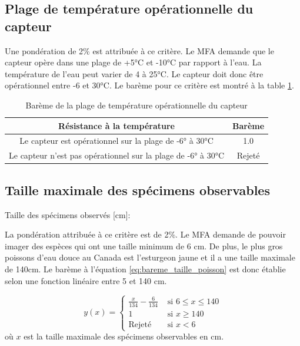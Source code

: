 \subsection{Plage de température opérationnelle du capteur}

Une pondération de 2\% est attribuée à ce critère. Le MFA demande que le capteur opère dans une plage de +5°C et -10°C par rapport à l'eau. La température de l'eau peut varier de 4 à 25°C. Le capteur doit donc être opérationnel entre -6 et 30°C. Le barème pour ce critère est montré à la table \ref{t:bareme_resistance_temperature}.

\begin{table}[htp]
   \footnotesize
   \centering
   \begin{tabular}{|c|c|}
        \hline
        Résistance à la température & Barème\\
        \hline
        \hline
        Le capteur est opérationnel sur la plage de -6° à 30°C & 1.0 \\
        \hline
        Le capteur n'est pas opérationnel sur la plage de -6° à 30°C & Rejeté \\
        \hline
   \end{tabular}
   \caption{Barème de la plage de température opérationnelle du capteur}
   \label{t:bareme_resistance_temperature}
\end{table}


\subsection{Taille maximale des spécimens observables}
Taille des spécimens observés [cm]:

La pondération attribuée à ce critère est de 2\%. Le MFA demande de pouvoir imager des espèces qui ont une taille minimum de 6 cm. De plus, le plus gros poissons d'eau douce au Canada est l'esturgeon jaune \cite{Esturgeon} et il a une taille maximale de 140cm. Le barème à l'équation \ref{eq:bareme_taille_poisson} est donc établie selon une fonction linéaire entre 5 et 140 cm.

\begin{equation}
y(x) = \begin{cases}
        \frac{x}{134}- \frac{6}{134} & \text{ si } 6 \leq x \leq 140\\
        1 & \text{ si } x \geq 140\\
        \text{Rejeté} & \text{ si } x < 6
    \end{cases}
    \label{eq:bareme_taille_poisson}
\end{equation}
où $x$ est la taille maximale des spécimens observables en cm.

